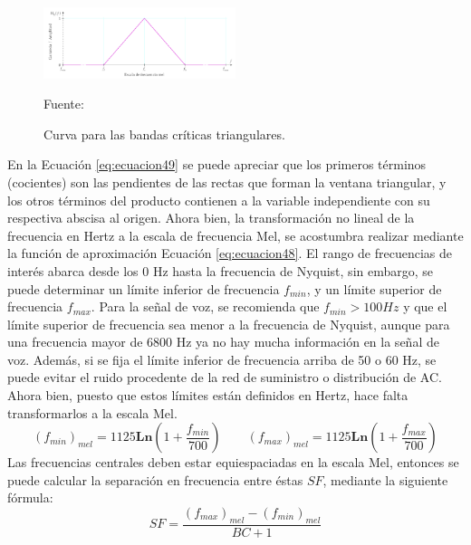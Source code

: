 \begin{enumerate}
\begin{enumerate}
\begin{figure}[H]
\begin{center}
\includegraphics[width=0.5\textwidth]{Imagenes/Cap2/image042}
\end{center}
\begin{center}
\vskip -0.5cm
\caption{\small{Curva para las bandas críticas triangulares.}}
\label{fig:figura2.41}
{\small{Fuente: \cite{eyra}}}
\end{center}
\end{figure}

En la Ecuación \eqref{eq:ecuacion49} se puede apreciar que los primeros términos (cocientes) son las pendientes de las rectas que forman la ventana triangular, y los otros términos del producto contienen a la variable independiente con su respectiva abscisa al origen. Ahora bien, la transformación no lineal de la frecuencia en Hertz a la escala de frecuencia Mel, se acostumbra realizar mediante la función de aproximación Ecuación \eqref{eq:ecuacion48}.
\vskip 0.5cm
El rango de frecuencias de interés abarca desde los 0 Hz hasta la frecuencia de Nyquist, sin embargo, se puede determinar un límite inferior de frecuencia $f_{min}$, y un límite superior de frecuencia $f_{max}$. Para la señal de voz, se recomienda que $f_{min} > 100 Hz$ y que el límite superior de frecuencia sea menor a la frecuencia de Nyquist, aunque para una frecuencia mayor de 6800 Hz ya no hay mucha información en la señal de voz. Además, si se fija el límite inferior de frecuencia arriba de 50 o 60 Hz, se puede evitar el ruido procedente de la red de suministro o distribución de AC. Ahora bien, puesto que estos límites están definidos en Hertz, hace falta transformarlos a la escala Mel.
\begin{equation}
\label{eq:ecuacion50}
\left ( f_{min} \right )_{mel} = 1125\mathbf{Ln}\left ( 1 + \frac{f_{min}}{700} \right )
\qquad
\left ( f_{max} \right )_{mel} = 1125\mathbf{Ln}\left ( 1 + \frac{f_{max}}{700} \right )
\end{equation}
Las frecuencias centrales deben estar equiespaciadas en la escala Mel, entonces se puede calcular la separación en frecuencia entre éstas $SF$, mediante la siguiente fórmula:
\begin{equation}
\label{eq:ecuacion51}
SF = \frac{\left ( f_{max} \right )_{mel} - \left ( f_{min} \right )_{mel}}{BC + 1}

\end{equation}
\end{enumerate}
\end{enumerate}
